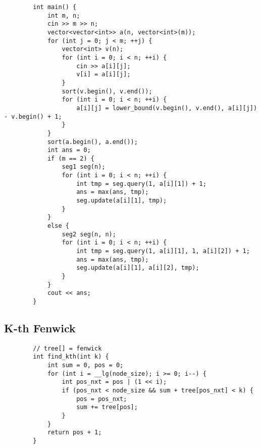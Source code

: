 \documentclass[landscape, 8pt, a4paper, oneside, twocolumn]{extarticle}
\begin{document}
\begin{verbatim}
		int main() {
			int m, n;
			cin >> m >> n;
			vector<vector<int>> a(n, vector<int>(m));
			for (int j = 0; j < m; ++j) {
				vector<int> v(n);
				for (int i = 0; i < n; ++i) {
					cin >> a[i][j];
					v[i] = a[i][j];
				}
				sort(v.begin(), v.end());
				for (int i = 0; i < n; ++i) {
					a[i][j] = lower_bound(v.begin(), v.end(), a[i][j]) - v.begin() + 1;
				}
			}
			sort(a.begin(), a.end());
			int ans = 0;
			if (m == 2) {
				seg1 seg(n);
				for (int i = 0; i < n; ++i) {
					int tmp = seg.query(1, a[i][1]) + 1;
					ans = max(ans, tmp);
					seg.update(a[i][1], tmp);
				}
			}
			else {
				seg2 seg(n, n);
				for (int i = 0; i < n; ++i) {
					int tmp = seg.query(1, a[i][1], 1, a[i][2]) + 1;
					ans = max(ans, tmp);
					seg.update(a[i][1], a[i][2], tmp);
				}
			}
			cout << ans;
		}
	\end{verbatim}
	\subsection {K-th Fenwick}
	\begin{verbatim}
		// tree[] = fenwick
		int find_kth(int k) {
			int sum = 0, pos = 0;
			for (int i = __lg(node_size); i >= 0; i--) {
				int pos_nxt = pos | (1 << i);
				if (pos_nxt < node_size && sum + tree[pos_nxt] < k) {
					pos = pos_nxt;
					sum += tree[pos];
				}
			}
			return pos + 1;
		}
	\end{verbatim}
\end{document}
